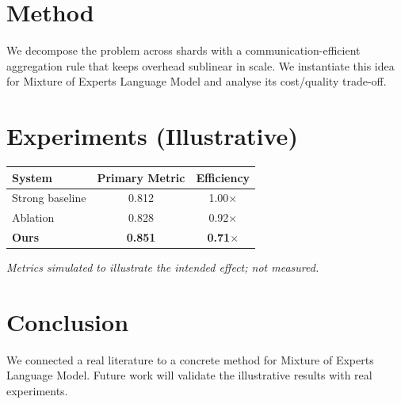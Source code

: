 \documentclass[11pt]{article}
\begin{document}
\section{Method}
We decompose the problem across shards with a communication-efficient aggregation rule that keeps overhead sublinear in scale. We instantiate this idea for Mixture of Experts Language Model and analyse its cost/quality trade-off.

\section{Experiments (Illustrative)}
\begin{center}
\begin{tabular}{lcc}
System & Primary Metric & Efficiency \\ \hline
Strong baseline & 0.812 & 1.00$\times$ \\
Ablation & 0.828 & 0.92$\times$ \\
\textbf{Ours} & \textbf{0.851} & \textbf{0.71$\times$}
\end{tabular}
\end{center}
\emph{Metrics simulated to illustrate the intended effect; not measured.}

\section{Conclusion}
We connected a real literature to a concrete method for Mixture of Experts Language Model. Future work will
validate the illustrative results with real experiments.
\end{document}
